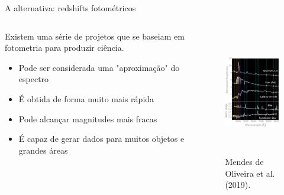 \begin{frame}[c]{A alternativa: redshifts fotométricos}
    \begin{columns}[c]
        \begin{column}{0.46\linewidth}
            \justifying
            Existem uma série de projetos que se baseiam em fotometria para produzir ciência.
            \begin{itemize}
                \justifying
                \item Pode ser considerada uma "aproximação" do espectro
                \item É obtida de forma muito mais rápida
                \item Pode alcançar magnitudes mais fracas
                \item É capaz de gerar dados para muitos objetos e grandes áreas
            \end{itemize}
        \end{column}
        \hspace*{-0.5cm}
        \begin{column}{0.46\linewidth}
            \begin{figure}
                \centering
                \includegraphics[height=5.5cm]{script/images/splus_spectra_sed.png}
                \caption{Mendes de Oliveira et al. (2019).}
            \end{figure}
        \end{column}
    \end{columns}
\end{frame}

